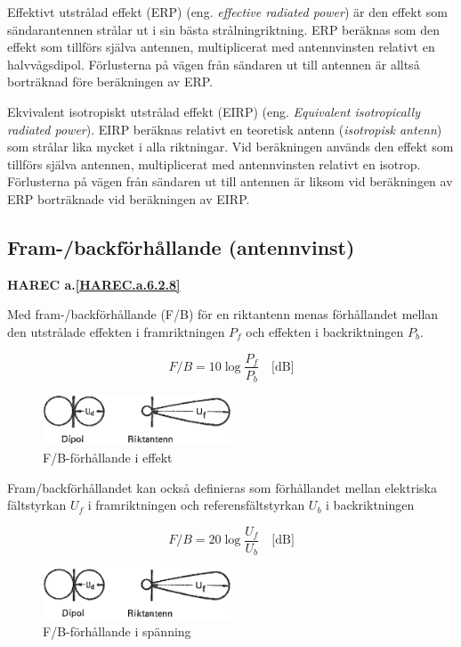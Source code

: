 Effektivt utstrålad effekt (ERP) (eng. \emph{effective radiated power}) är den
effekt som sändarantennen strålar ut i sin bästa
strålningriktning. ERP beräknas som den effekt som tillförs själva
antennen, multiplicerat med antennvinsten relativt en
halvvågsdipol. Förlusterna på vägen från sändaren ut till antennen är
alltså borträknad före beräkningen av ERP.

Ekvivalent isotropiskt utstrålad effekt (EIRP) (eng. \emph{Equivalent isotropically radiated power}).
EIRP beräknas relativt en teoretisk antenn (\emph{isotropisk antenn}) som
strålar lika mycket i alla riktningar. Vid beräkningen används den effekt
som tillförs själva antennen, multiplicerat med antennvinsten relativt en
isotrop. Förlusterna på vägen från sändaren ut till antennen är liksom vid beräkningen av ERP borträknade vid beräkningen av EIRP.

\subsection{Fram-/backförhållande (antennvinst)}
\textbf{
HAREC a.\ref{HAREC.a.6.2.8}\label{myHAREC.a.6.2.8}
}

Med fram-/backförhållande (F/B) för en riktantenn menas förhållandet
mellan den utstrålade effekten i framriktningen \(P_f\) och effekten i
backriktningen \(P_b\).

\[ F/B = 10 \log\frac{P_f}{P_b} \quad \text{[dB]} \]

\begin{figure}
  \includegraphics[width=0.5\textwidth]{images/cropped_pdfs/bild_2_6-08.pdf}
  \caption{F/B-förhållande i effekt}
  \label{fig:bildII6-8}
\end{figure}

Fram/backförhållandet kan också definieras som förhållandet mellan
elektriska fältstyrkan \(U_f\) i framriktningen och
referensfältstyrkan \(U_b\) i backriktningen

\[ F/B = 20 \log\frac{U_f}{U_b} \quad \text{[dB]} \]

\begin{figure}
  \includegraphics[width=0.5\textwidth]{images/cropped_pdfs/bild_2_6-09.pdf}
  \caption{F/B-förhållande i spänning}
  \label{fig:bildII6-9}
\end{figure}

